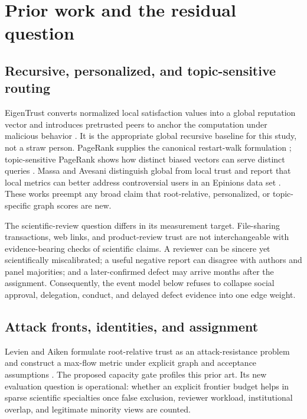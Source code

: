 \documentclass[11pt]{article}
\begin{document}
\section{Prior work and the residual question}

\subsection{Recursive, personalized, and topic-sensitive routing}

EigenTrust converts normalized local satisfaction values into a global reputation vector and introduces pretrusted peers to anchor the computation under malicious behavior \citep{kamvar2003eigentrust}.  It is the appropriate global recursive baseline for this study, not a straw person.  PageRank supplies the canonical restart-walk formulation \citep{page1999pagerank}; topic-sensitive PageRank shows how distinct biased vectors can serve distinct queries \citep{haveliwala2002topic}.  Massa and Avesani distinguish global from local trust and report that local metrics can better address controversial users in an Epinions data set \citep{massa2005local}.  These works preempt any broad claim that root-relative, personalized, or topic-specific graph scores are new.

The scientific-review question differs in its measurement target.  File-sharing transactions, web links, and product-review trust are not interchangeable with evidence-bearing checks of scientific claims.  A reviewer can be sincere yet scientifically miscalibrated; a useful negative report can disagree with authors and panel majorities; and a later-confirmed defect may arrive months after the assignment.  Consequently, the event model below refuses to collapse social approval, delegation, conduct, and delayed defect evidence into one edge weight.

\subsection{Attack fronts, identities, and assignment}

Levien and Aiken formulate root-relative trust as an attack-resistance problem and construct a max-flow metric under explicit graph and acceptance assumptions \citep{levien1998attack}.  The proposed capacity gate profiles this prior art.  Its new evaluation question is operational: whether an explicit frontier budget helps in sparse scientific specialties once false exclusion, reviewer workload, institutional overlap, and legitimate minority views are counted.
\end{document}
